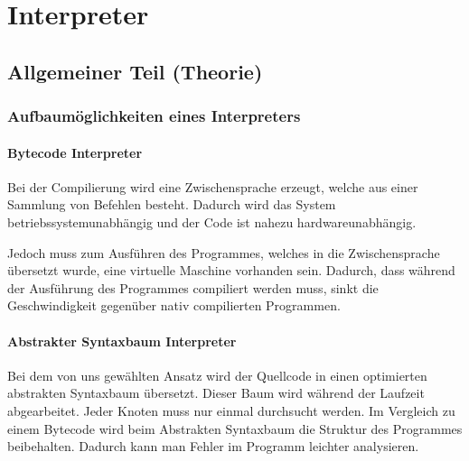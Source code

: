

\chapter{Interpreter}


\section{Allgemeiner Teil (Theorie)}

\subsection{Aufbaumöglichkeiten eines Interpreters}

\subsubsection{Bytecode Interpreter}
Bei der Compilierung wird eine Zwischensprache erzeugt, welche aus einer Sammlung von Befehlen besteht. Dadurch wird das System
betriebssystemunabhängig und der Code ist nahezu hardwareunabhängig.

Jedoch muss zum Ausführen des Programmes, welches in die Zwischensprache übersetzt wurde, eine virtuelle Maschine vorhanden sein.
Dadurch, dass während der Ausführung des Programmes compiliert werden muss, sinkt die Geschwindigkeit gegenüber
nativ compilierten Programmen.


\subsubsection{Abstrakter Syntaxbaum Interpreter}
Bei dem von uns gewählten Ansatz wird der Quellcode in einen optimierten abstrakten Syntaxbaum übersetzt. Dieser Baum wird während der Laufzeit
abgearbeitet. Jeder Knoten muss nur einmal durchsucht werden. Im Vergleich zu einem Bytecode wird beim Abstrakten Syntaxbaum die Struktur
des Programmes beibehalten. Dadurch kann man Fehler im Programm leichter analysieren.

